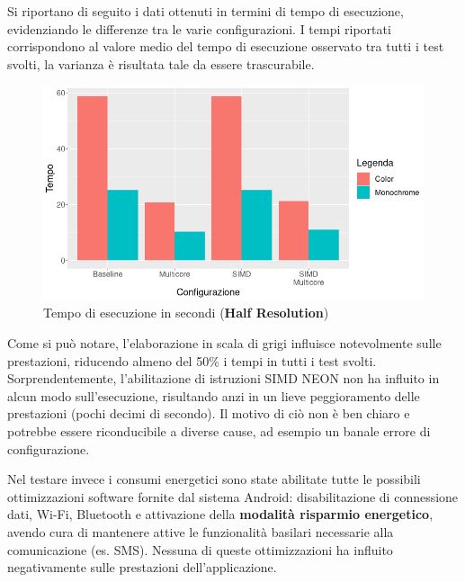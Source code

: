 Si riportano di seguito i dati ottenuti in termini di tempo di esecuzione, evidenziando le differenze tra le varie configurazioni.
I tempi riportati corrispondono al valore medio del tempo di esecuzione osservato tra tutti i test svolti, la varianza è 
risultata tale da essere trascurabile.

\begin{figure}[h!]
    \begin{center}
        \includegraphics[scale=0.5]{img/execution_time.png}
        \caption{Tempo di esecuzione in secondi (\textbf{Half Resolution})}
    \end{center}
\end{figure}

Come si può notare, l'elaborazione in scala di grigi influisce notevolmente sulle prestazioni, riducendo almeno del 50\% i tempi
in tutti i test svolti. Sorprendentemente, l'abilitazione di istruzioni SIMD NEON non ha influito in alcun modo 
sull'esecuzione, risultando anzi in un lieve peggioramento delle prestazioni (pochi decimi di secondo). Il motivo di ciò non è
ben chiaro e potrebbe essere riconducibile a diverse cause, ad esempio un banale errore di configurazione.

Nel testare invece i consumi energetici sono state abilitate tutte le possibili ottimizzazioni software fornite dal sistema 
Android: disabilitazione di connessione dati, Wi-Fi, Bluetooth e attivazione della \textbf{modalità risparmio energetico}, 
avendo cura di mantenere attive le funzionalità basilari necessarie alla comunicazione (es. SMS). Nessuna di queste 
ottimizzazioni ha influito negativamente sulle prestazioni dell'applicazione.